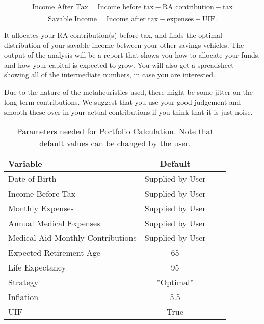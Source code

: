 \documentclass[a4paper, justified]{tufte-handout}
\begin{document}
\begin{equation}
\textrm{Income After Tax} = \textrm{Income before tax} - \textrm{RA contribution} - \textrm{tax}
\end{equation}

\begin{equation}
\textrm{Savable Income} = \textrm{Income after tax} - \textrm{expenses} - \textrm{UIF}.
\end{equation}

It allocates your RA contribution(s) before tax, and finds the optimal distribution of your savable income between your other savings vehicles. The output of the analysis will be a report that shows you how to allocate your funds, and how your capital is expected to grow. You will also get a spreadsheet showing all of the intermediate numbers, in case you are interested.


Due to the nature of the metaheuristics used, there might be some jitter on the long-term contributions. We suggest that you use your good judgement and smooth these over in your actual contributions if you think that it is just noise.
\begin{table}[bt]
	\centering
	\caption{Parameters needed for Portfolio Calculation. Note that default values can be changed by the user.}
	\label{tab:PortfolioParameters}
	\begin{tabular}{lccc}
		\toprule
	\textbf{Variable} 												& \textbf{Default} \\ 
			\midrule
	Date of Birth 										&  Supplied by User\\ 
	Income Before Tax 								&  Supplied by User\\ 
	Monthly Expenses							&  Supplied by User\\ 
	Annual Medical Expenses						&  Supplied by User\\ 
	Medical Aid Monthly Contributions	&  Supplied by User\\ 
	Expected Retirement Age					&65\\
	Life Expectancy										&95\\
	Strategy												&''Optimal''\\
	Inflation													&5.5\\
	UIF															&True\\ 
	\bottomrule
\end{tabular}
\end{table}
\end{document}
